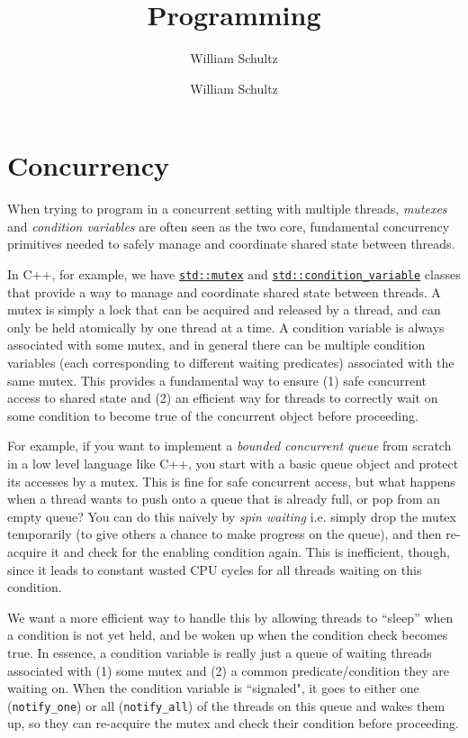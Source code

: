 \documentclass[10pt,a4paper]{article}
\author{William Schultz}
\begin{document}
\title{Programming}
\author{William Schultz}
\maketitle

\section{Concurrency}

When trying to program in a concurrent setting with multiple threads, \textit{mutexes} and \textit{condition variables} are often seen as the two core, fundamental concurrency primitives needed to safely manage and coordinate shared state between threads.

In C++, for example, we have \texttt{\href{https://en.cppreference.com/cpp/thread/mutex}{std::mutex}} and \texttt{\href{https://en.cppreference.com/cpp/thread/condition_variable}{std::condition\_variable}} classes that provide a way to manage and coordinate shared state between threads. A mutex is simply a lock that can be acquired and released by a thread, and can only be held atomically by one thread at a time. A condition variable is always associated with some mutex, and in general there can be multiple condition variables (each corresponding to different waiting predicates) associated with the same mutex.
This provides a fundamental way to ensure (1) safe concurrent access to shared state and (2) an efficient way for threads to correctly wait on some condition to become true of the concurrent object before proceeding.

For example, if you want to implement a \textit{bounded concurrent queue} from scratch in a low level language like C++, you start with a basic queue object and protect its accesses by a mutex. This is fine for safe concurrent access, but what happens when a thread wants to push onto a queue that is already full, or pop from an empty queue? You can do this naively by \textit{spin waiting} i.e. simply drop the mutex temporarily (to give others a chance to make progress on the queue), and then re-acquire it and check for the enabling condition again. This is inefficient, though, since it leads to constant wasted CPU cycles for all threads waiting on this condition. 

We want a more efficient way to handle this by allowing threads to ``sleep'' when a condition is not yet held, and be woken up when the condition check becomes true. In essence, a condition variable is really just a queue of waiting threads associated with (1) some mutex and (2) a common predicate/condition they are waiting on. When the condition variable is ``signaled", it goes to either one (\texttt{notify\_one}) or all (\texttt{notify\_all}) of the threads on this queue and wakes them up, so they can re-acquire the mutex and check their condition before proceeding.
\end{document}
